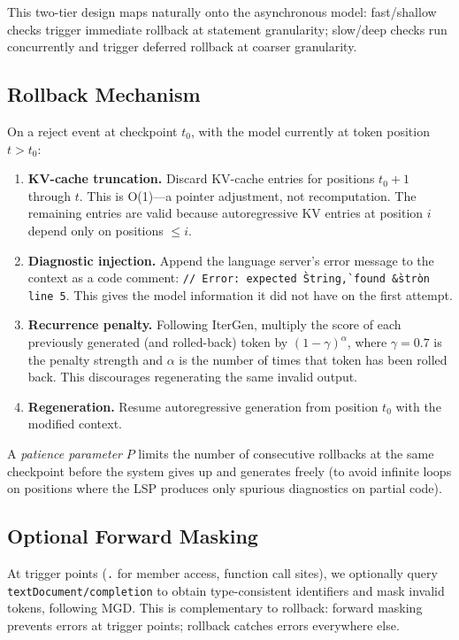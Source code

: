 \documentclass[11pt,letterpaper]{article}
\begin{document}
This two-tier design maps naturally onto the asynchronous model: fast/shallow checks trigger immediate rollback at statement granularity; slow/deep checks run concurrently and trigger deferred rollback at coarser granularity.

\subsection{Rollback Mechanism}

On a reject event at checkpoint $t_0$, with the model currently at token position $t > t_0$:

\begin{enumerate}[leftmargin=*,itemsep=2pt]
  \item \textbf{KV-cache truncation.} Discard KV-cache entries for positions $t_0+1$ through $t$. This is O(1)---a pointer adjustment, not recomputation. The remaining entries are valid because autoregressive KV entries at position $i$ depend only on positions $\leq i$.
  \item \textbf{Diagnostic injection.} Append the language server's error message to the context as a code comment: \texttt{// Error: expected \`String\`, found \`\&str\` on line 5}. This gives the model information it did not have on the first attempt.
  \item \textbf{Recurrence penalty.} Following IterGen, multiply the score of each previously generated (and rolled-back) token by $(1-\gamma)^\alpha$, where $\gamma = 0.7$ is the penalty strength and $\alpha$ is the number of times that token has been rolled back. This discourages regenerating the same invalid output.
  \item \textbf{Regeneration.} Resume autoregressive generation from position $t_0$ with the modified context.
\end{enumerate}

A \emph{patience parameter} $P$ limits the number of consecutive rollbacks at the same checkpoint before the system gives up and generates freely (to avoid infinite loops on positions where the LSP produces only spurious diagnostics on partial code).

\subsection{Optional Forward Masking}

At trigger points (\texttt{.} for member access, function call sites), we optionally query \texttt{textDocument/completion} to obtain type-consistent identifiers and mask invalid tokens, following MGD. This is complementary to rollback: forward masking prevents errors at trigger points; rollback catches errors everywhere else.
\end{document}
